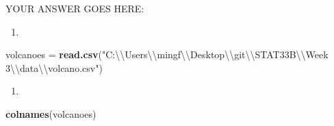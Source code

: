 \documentclass[
]{article}
\newenvironment{Shaded}{\begin{snugshade}}{\end{snugshade}}
\newcommand{\CharTok}[1]{\textcolor[rgb]{0.31,0.60,0.02}{#1}}
\newcommand{\KeywordTok}[1]{\textcolor[rgb]{0.13,0.29,0.53}{\textbf{#1}}}
\newcommand{\NormalTok}[1]{#1}
\newcommand{\StringTok}[1]{\textcolor[rgb]{0.31,0.60,0.02}{#1}}
\providecommand{\tightlist}{%
  \setlength{\itemsep}{0pt}\setlength{\parskip}{0pt}}
\begin{document}
YOUR ANSWER GOES HERE:

\begin{enumerate}
\def\labelenumi{\arabic{enumi}.}
\tightlist
\item
\end{enumerate}

\begin{Shaded}
\begin{Highlighting}[]
\NormalTok{volcanoes =}\StringTok{ }\KeywordTok{read.csv}\NormalTok{(}\StringTok{"C:}\CharTok{\textbackslash{}\textbackslash{}}\StringTok{Users}\CharTok{\textbackslash{}\textbackslash{}}\StringTok{mingf}\CharTok{\textbackslash{}\textbackslash{}}\StringTok{Desktop}\CharTok{\textbackslash{}\textbackslash{}}\StringTok{git}\CharTok{\textbackslash{}\textbackslash{}}\StringTok{STAT33B}\CharTok{\textbackslash{}\textbackslash{}}\StringTok{Week 3}\CharTok{\textbackslash{}\textbackslash{}}\StringTok{data}\CharTok{\textbackslash{}\textbackslash{}}\StringTok{volcano.csv"}\NormalTok{)}
\end{Highlighting}
\end{Shaded}

\begin{enumerate}
\def\labelenumi{\arabic{enumi}.}
\setcounter{enumi}{1}
\tightlist
\item
\end{enumerate}

\begin{Shaded}
\begin{Highlighting}[]
\KeywordTok{colnames}\NormalTok{(volcanoes)}
\end{Highlighting}
\end{Shaded}
\end{document}

